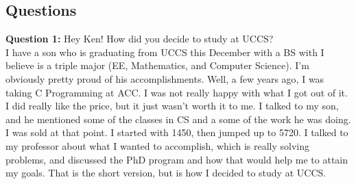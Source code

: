 \subsection{Questions}
\textbf{Question 1:} Hey Ken! How did you decide to study at UCCS?\\
I have a son who is graduating from UCCS this December with a BS with I believe is a triple major (EE, Mathematics, and Computer Science).  I'm obviously pretty proud of his accomplishments.  Well, a few years ago, I was taking C Programming at ACC.  I was not really happy with what I got out of it.  I did really like the price, but it just wasn't worth it to me.  I talked to my son, and he mentioned some of the classes in CS and a some of the work he was doing.  I was sold at that point.  I started with 1450, then jumped up to 5720.  I talked to my professor about what I wanted to accomplish, which is really solving problems, and discussed the PhD program and how that would help me to attain my goals.  That is the short version, but is how I decided to study at UCCS.\\

